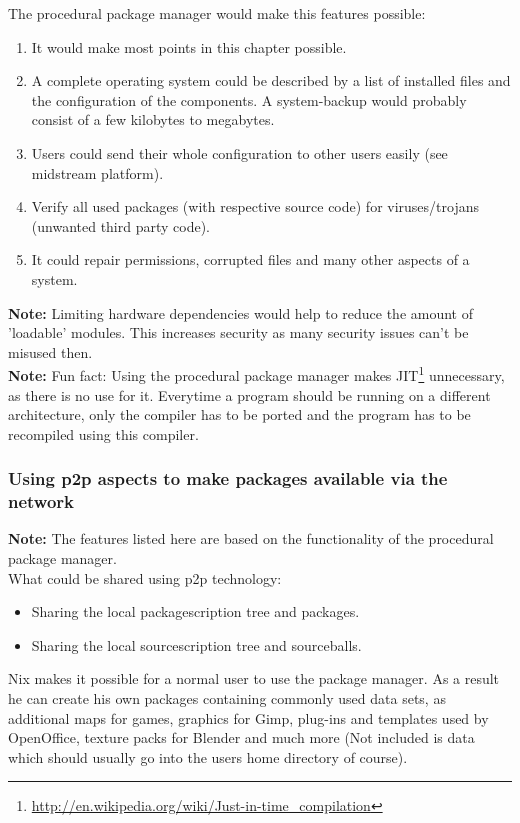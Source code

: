 \documentclass[a4paper,10pt]{article}
\begin{document}
The procedural package manager would make this features possible:
\begin{enumerate}
\item It would make most points in this chapter possible.
\item A complete operating system could be described by a list of installed files and the configuration of the components. A system-backup would probably consist of a few kilobytes to megabytes.
\item Users could send their whole configuration to other users easily (see midstream platform).
\item Verify all used packages (with respective source code) for viruses/trojans (unwanted third party code).
\item It could repair permissions, corrupted files and many other aspects of a system.

\end{enumerate}

\textbf{Note:} Limiting hardware dependencies would help to reduce the amount of 'loadable' modules. This increases security as many security issues can't be misused then. \\

\textbf{Note:} Fun fact: Using the procedural package manager makes JIT\footnote{\url{http://en.wikipedia.org/wiki/Just-in-time_compilation}} unnecessary, as there is no use for it. Everytime a program should be running on a different architecture, only the compiler has to be ported and the program has to be recompiled using this compiler.








\subsubsection{Using p2p aspects to make packages available via the network}
\textbf{Note:} The features listed here are based on the functionality of the procedural package manager.\\

What could be shared using p2p technology:
\begin{itemize}
\item Sharing the local packagescription tree and packages.
\item Sharing the local sourcescription tree and sourceballs.
\end{itemize}
Nix makes it possible for a normal user to use the package manager. As a result he can create his own packages containing commonly used data sets, as additional maps for games, graphics for Gimp, plug-ins and templates used by OpenOffice, texture packs for Blender and much more (Not included is data which should usually go into the users home directory of course).\\
\end{document}

